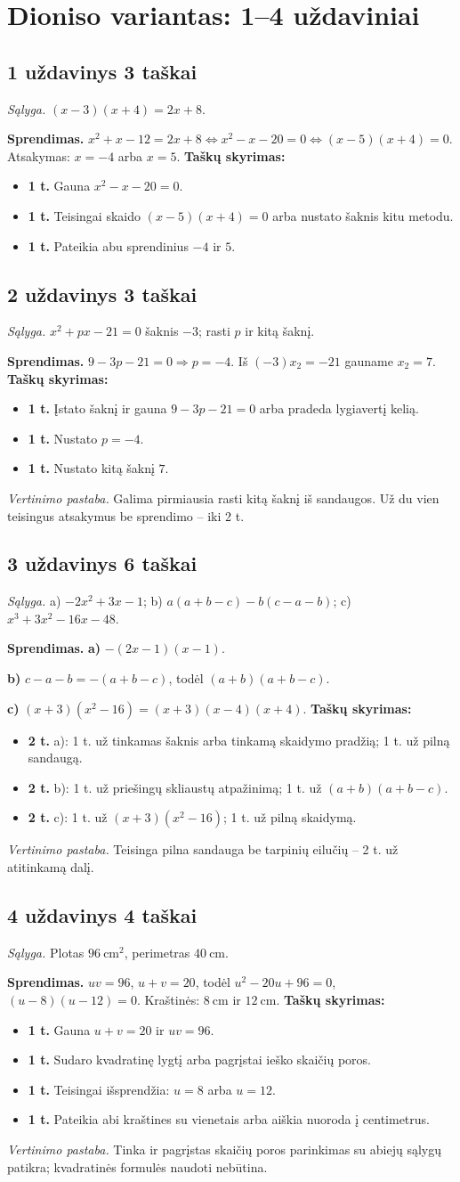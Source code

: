 \documentclass[11pt,a4paper]{article}
\newcommand{\uzd}[3]{\subsection*{#1 uždavinys \hfill #2 taškai}\textit{Sąlyga.} #3\par}
\newcommand{\kriterijai}{\textbf{Taškų skyrimas:}}
\newcommand{\balas}[2]{\item \textbf{#1 t.} #2}
\begin{document}
\section*{Dioniso variantas: 1--4 uždaviniai}
\uzd{1}{3}{$(x-3)(x+4)=2x+8$.}
\textbf{Sprendimas.} $x^2+x-12=2x+8\iff x^2-x-20=0\iff(x-5)(x+4)=0$. Atsakymas: $x=-4$ arba $x=5$.
\kriterijai\begin{itemize}
\balas{1}{Gauna $x^2-x-20=0$.}
\balas{1}{Teisingai skaido $(x-5)(x+4)=0$ arba nustato šaknis kitu metodu.}
\balas{1}{Pateikia abu sprendinius $-4$ ir $5$.}
\end{itemize}
\uzd{2}{3}{$x^2+px-21=0$ šaknis $-3$; rasti $p$ ir kitą šaknį.}
\textbf{Sprendimas.} $9-3p-21=0\Rightarrow p=-4$. Iš $(-3)x_2=-21$ gauname $x_2=7$.
\kriterijai\begin{itemize}
\balas{1}{Įstato šaknį ir gauna $9-3p-21=0$ arba pradeda lygiavertį kelią.}
\balas{1}{Nustato $p=-4$.}
\balas{1}{Nustato kitą šaknį $7$.}
\end{itemize}
\textit{Vertinimo pastaba.} Galima pirmiausia rasti kitą šaknį iš sandaugos. Už du vien teisingus atsakymus be sprendimo -- iki 2 t.
\uzd{3}{6}{a) $-2x^2+3x-1$; b) $a(a+b-c)-b(c-a-b)$; c) $x^3+3x^2-16x-48$.}
\textbf{Sprendimas.} \textbf{a)} $-(2x-1)(x-1)$.\par\textbf{b)} $c-a-b=-(a+b-c)$, todėl $(a+b)(a+b-c)$.\par\textbf{c)} $(x+3)(x^2-16)=(x+3)(x-4)(x+4)$.
\kriterijai\begin{itemize}
\balas{2}{a): 1 t. už tinkamas šaknis arba tinkamą skaidymo pradžią; 1 t. už pilną sandaugą.}
\balas{2}{b): 1 t. už priešingų skliaustų atpažinimą; 1 t. už $(a+b)(a+b-c)$.}
\balas{2}{c): 1 t. už $(x+3)(x^2-16)$; 1 t. už pilną skaidymą.}
\end{itemize}
\textit{Vertinimo pastaba.} Teisinga pilna sandauga be tarpinių eilučių -- 2 t. už atitinkamą dalį.
\uzd{4}{4}{Plotas $96\ \mathrm{cm}^2$, perimetras $40\ \mathrm{cm}$.}
\textbf{Sprendimas.} $uv=96$, $u+v=20$, todėl $u^2-20u+96=0$, $(u-8)(u-12)=0$. Kraštinės: $8\ \mathrm{cm}$ ir $12\ \mathrm{cm}$.
\kriterijai\begin{itemize}
\balas{1}{Gauna $u+v=20$ ir $uv=96$.}
\balas{1}{Sudaro kvadratinę lygtį arba pagrįstai ieško skaičių poros.}
\balas{1}{Teisingai išsprendžia: $u=8$ arba $u=12$.}
\balas{1}{Pateikia abi kraštines su vienetais arba aiškia nuoroda į centimetrus.}
\end{itemize}
\textit{Vertinimo pastaba.} Tinka ir pagrįstas skaičių poros parinkimas su abiejų sąlygų patikra; kvadratinės formulės naudoti nebūtina.
\newpage
\end{document}

